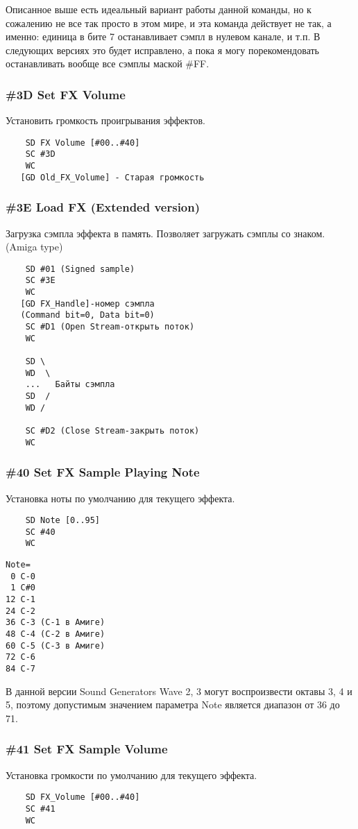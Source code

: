 \documentclass[a4paper,11pt]{article}
\begin{document}
Описанное выше есть идеальный вариант работы данной команды, но к сожалению не все так просто в этом мире, и эта команда действует не так, а именно: единица в бите 7 останавливает сэмпл в нулевом канале, и т.п. В следующих версиях это будет исправлено,  а пока я могу порекомендовать останавливать вообще все сэмплы маской \#FF.

\subsubsection{\#3D Set FX Volume}
Установить громкость проигрывания эффектов.
\begin{verbatim}
    SD FX Volume [#00..#40]
    SC #3D
    WC
   [GD Old_FX_Volume] - Старая громкость
\end{verbatim}

\subsubsection{\#3E Load FX (Extended version)}
Загрузка сэмпла эффекта в память. Позволяет загружать сэмплы со знаком. (Amiga type)
\begin{verbatim}
    SD #01 (Signed sample)
    SC #3E
    WC
   [GD FX_Handle]-номер сэмпла
   (Command bit=0, Data bit=0)
    SC #D1 (Open Stream-открыть поток)
    WC

    SD \
    WD  \
    ...   Байты сэмпла
    SD  /
    WD /

    SC #D2 (Close Stream-закрыть поток)
    WC
\end{verbatim}

\subsubsection{\#40 Set FX Sample Playing Note\label{cmd:40}}
Установка ноты по умолчанию для текущего эффекта.
\begin{verbatim}
    SD Note [0..95]
    SC #40
    WC
\end{verbatim}

\begin{verbatim}
Note=
 0 C-0
 1 C#0
12 C-1
24 C-2
36 C-3 (C-1 в Амиге)
48 C-4 (C-2 в Амиге)
60 C-5 (C-3 в Амиге)
72 C-6
84 C-7
\end{verbatim}

В данной версии Sound Generators Wave 2, 3 могут воспроизвести октавы 3, 4 и 5,  поэтому допустимым значением параметра Note является диапазон от 36 до 71.

\subsubsection{\#41 Set FX Sample Volume\label{cmd:41}}
Установка громкости по умолчанию для текущего эффекта.
\begin{verbatim}
    SD FX_Volume [#00..#40]
    SC #41
    WC
\end{verbatim}
\end{document}
